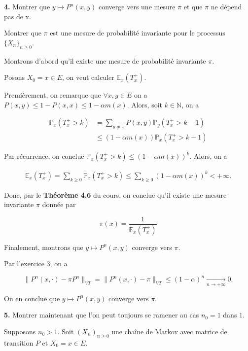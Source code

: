 \documentclass[french]{article}
\begin{document}
	\begin{tcolorbox}[colback=gray!5!white,colframe=gray!75!black]
		\textbf{4.} Montrer que $y \mapsto P^n(x,y)$ converge vers une mesure $\pi$ et que $\pi$ ne dépend pas de x.
		
		Montrer que $\pi$ est une mesure de probabilité invariante pour le processus $\{X_n\}_{n \geq 0}$.
	\end{tcolorbox}

	Montrons d'abord qu'il existe une mesure de probabilité invariante $\pi$.
	
	Posons $X_0 = x \in E$, on veut calculer $\mathbb{E}_x(T_x^+)$.
	
	Premièrement, on remarque que $\forall x,y \in E$ on a $P(x,y) \leq 1 - P(x,x) \leq 1 - \alpha m(x)$. Alors, soit $k \in \mathbb{N}$, on a
	
	\begin{align}
		\mathbb{P}_x(T_x^+ > k) &= \sum_{y \not= x} P(x, y)\mathbb{P}_y(T_x^+ > k-1)\\
		&\leq (1 - \alpha m(x)) \mathbb{P}_x(T_x^+ > k - 1)
	\end{align}
	
	Par récurrence, on conclue $\mathbb{P}_x(T_x^+ > k) \leq (1 - \alpha m(x))^k$. Alors, on a
	
	\begin{align}
		\mathbb{E}_x(T_x^+) = \sum_{k \geq 0} \mathbb{P}_x(T_x^+ > k) \leq \sum_{k \geq 0} (1 - \alpha m(x))^k < +\infty.
	\end{align}
	
	Donc, par le \textbf{Théorème 4.6} du cours, on conclue qu'il existe une mesure invariante $\pi$ donnée par
	
	$$ \pi(x) = \frac{1}{\mathbb{E}_x(T_x^+)} $$
	
	Finalement, montrons que $y \mapsto P^n(x,y)$ converge vers $\pi$.
	
	Par l'exercice 3, on a
	
	$$ \| P^n(x, \cdot) - \pi P^n \|_{VT} = \| P^n(x, \cdot) - \pi \|_{VT} \leq (1 - \alpha)^n \xrightarrow[n \to +\infty]{} 0.$$
	
	On en conclue que $y \mapsto P^n(x,y)$ converge vers $\pi$.

	\begin{tcolorbox}[colback=gray!5!white,colframe=gray!75!black]
		\textbf{5.} Montrer maintenant que l’on peut toujours se ramener au cas $n_0 = 1$ dans $1$.
	\end{tcolorbox}

	Supposons $n_0 > 1$. Soit $(X_n)_{n \geq 0}$ une chaîne de Markov avec matrice de transition $P$ et $X_0 = x \in E$.
	
\end{document}
